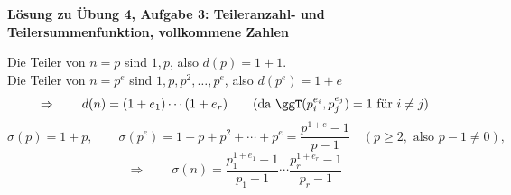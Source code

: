 \textbf{Lösung zu Übung 4, Aufgabe 3: Teileranzahl- und Teilersummenfunktion, vollkommene Zahlen}

\begin{loesung}
Die Teiler von $n = p$ sind $1, p$, also $d(p) = 1 + 1$.\\
Die Teiler von $n = p^e$ sind $1, p, p^2, \ldots, p^e$, also $d(p^e) = 1 + e$
\[
\Rightarrow\qquad d(n) = (1 + e_1) \cdots (1 + e_r) \qquad (\text{da } \ggT(p_i^{e_i}, p_j^{e_j}) = 1 \text{ für } i \neq j)
\]
\[
\sigma(p) = 1 + p, \qquad \sigma(p^e) = 1 + p + p^2 + \cdots + p^e = \frac{p^{1+e} - 1}{p - 1} \quad (p \geq 2, \text{ also } p - 1 \neq 0),
\]
\[
\Rightarrow\qquad \sigma(n) = \frac{p_1^{1+e_1} - 1}{p_1 - 1} \cdots \frac{p_r^{1+e_r} - 1}{p_r - 1}
\]
\end{loesung}
